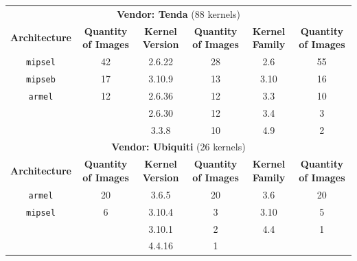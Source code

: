 \begin{table}[H]
{\begin{tabular}{cccccc}
\multicolumn{6}{c}{\textbf{Vendor: Tenda} (88 kernels)}                                                                    \\
\textbf{Architecture} & \multicolumn{1}{c|}{\textbf{Quantity of Images}} & \textbf{Kernel Version} & \multicolumn{1}{c|}{\textbf{Quantity of Images}} & \textbf{Kernel Family} & \textbf{Quantity of Images} \\ \hline
{\tt mipsel}            & \multicolumn{1}{c|}{42}                & 2.6.22                 & \multicolumn{1}{c|}{28}                           & 2.6                     & 55                         \\
{\tt mipseb}            & \multicolumn{1}{c|}{17}                & 3.10.9                  & \multicolumn{1}{c|}{13}                          & 3.10                    & 16                         \\
{\tt armel}             & \multicolumn{1}{c|}{12}                & 2.6.36                  & \multicolumn{1}{c|}{12}                          & 3.3                     & 10                         \\
                        & \multicolumn{1}{c|}{}                  & 2.6.30                  & \multicolumn{1}{c|}{12}                          & 3.4                     & 3                          \\
                        & \multicolumn{1}{c|}{}                  & 3.3.8                   & \multicolumn{1}{c|}{10}                          & 4.9                     & 2                          \\ \hline

\multicolumn{6}{c}{\textbf{Vendor: Ubiquiti} (26 kernels)}                                                                    \\
\textbf{Architecture} & \multicolumn{1}{c|}{\textbf{Quantity of Images}} & \textbf{Kernel Version} & \multicolumn{1}{c|}{\textbf{Quantity of Images}} & \textbf{Kernel Family} & \textbf{Quantity of Images} \\ \hline
{\tt armel}             & \multicolumn{1}{c|}{20}                & 3.6.5                  & \multicolumn{1}{c|}{20}                           & 3.6                     & 20                         \\
{\tt mipsel}            & \multicolumn{1}{c|}{6}                 & 3.10.4                  & \multicolumn{1}{c|}{3}                           & 3.10                    & 5                          \\
                        & \multicolumn{1}{c|}{}                  & 3.10.1                  & \multicolumn{1}{c|}{2}                           & 4.4                     & 1                          \\
                        & \multicolumn{1}{c|}{}                  & 4.4.16                  & \multicolumn{1}{c|}{1}                           &                         &                            \\ \hline


\end{tabular}}
\end{table}
